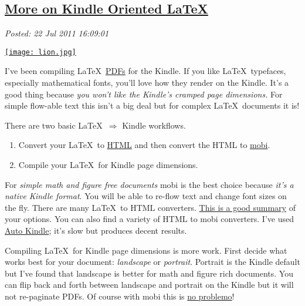 %

\subsection*{\href{https://bakerjd99.wordpress.com/2011/07/22/more-on-kindle-oriented-latex/}{More on Kindle Oriented \LaTeX}}


\noindent\emph{Posted: 22 Jul 2011 16:09:01}
\vspace{6pt}

\captionsetup[floatingfigure]{labelformat=empty}
\begin{floatingfigure}[l]{0.20\textwidth}
\centering
\href{http://www.personal.psu.edu/ixc128/latex.html}{\texttt{[image: lion.jpg]}}
\label{fig:1543X0}
\end{floatingfigure}I've been compiling \LaTeX\
\href{http://www.fileinfo.com/extension/pdf}{PDFs} for the Kindle. If
you like \LaTeX\ typefaces, especially mathematical fonts, you'll
love how they render on the Kindle. It's a good thing because \emph{you
won't like the Kindle's cramped page dimensions.} For simple flow-able
text this isn't a big deal but for complex \LaTeX\ documents it
is!

There are two basic \LaTeX\ $\Longrightarrow$ Kindle workflows.

\begin{enumerate}
\item
  Convert your \LaTeX\ to
  \href{http://www.fileinfo.com/extension/html}{HTML} and then convert
  the HTML to
  \href{http://pcsupport.about.com/od/fileextensions/f/mobifile.htm}{mobi}.
\item
  Compile your \LaTeX\ for Kindle page dimensions.
\end{enumerate}
For \emph{simple math and figure free documents} mobi is the best choice
because \emph{it's a native Kindle format}. You will be able to re-flow
text and change font sizes on the fly. There are many \LaTeX\ to
HTML converters. \href{http://enc.com.au/docs/latexhtml/}{This is a good
summary} of your options. You can also find a variety of HTML to mobi
converters. I've used
\href{http://sourceforge.net/projects/autokindle/}{Auto Kindle}; it's
slow but produces decent results.

Compiling \LaTeX\ for Kindle page dimensions is more work. First
decide what works best for your document: \emph{landscape} or
\emph{portrait}. Portrait is the Kindle default but I've found that
landscape is better for math and figure rich documents. You can flip
back and forth between landscape and portrait on the Kindle but it will
not re-paginate PDFs. Of course with mobi this is
\href{http://www.youtube.com/watch?v=4QWfrxYt9DQ\&NR=1}{no problemo}!


